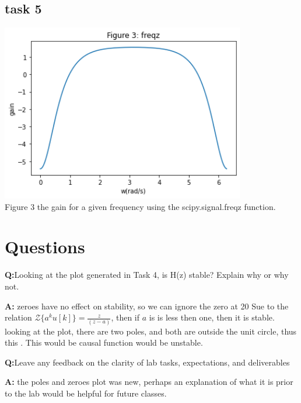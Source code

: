 \documentclass[12pt,a4paper]{article}
\newcommand{\Q}{\leavevmode\par\textbf {Q:}}
\newcommand{\A}{\par\textbf{A:} \normalfont}
\begin{document}
\subsection*{task 5}
\includegraphics[width=0.8\textwidth]{Figure 3.png}\\
Figure 3 the gain for a given frequency using the scipy.signal.freqz function.\\


\section{Questions}\label{sec:res}

\Q Looking at the plot generated in Task 4, is H(z) stable? Explain why or why not.
\A zeroes have no effect on stability, so we can ignore the zero at 20
 Sue to the relation $\mathcal{Z}\{a^k u[k]\} = \frac{z}{(z-a)}$, then if $a$ is is less then one, then it is stable. looking at the plot, there are two poles, and both are outside the unit circle, thus this . This would be causal function would be unstable.

\Q Leave any feedback on the clarity of lab tasks, expectations, and deliverables
\A the poles and zeroes plot was new, perhaps an explanation of what it is prior to the lab would be helpful for future classes.





\end{document}
